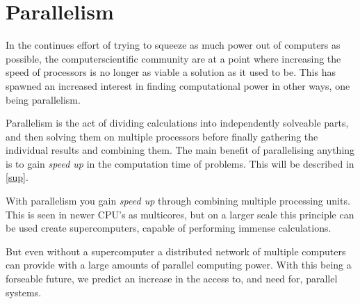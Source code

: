 

\section{Parallelism}

In the continues effort of trying to squeeze as much power out of computers as possible, the computerscientific community are at a point where increasing the speed of processors is no longer as viable a solution as it used to be. This has spawned an increased interest in finding computational power in other ways, one being parallelism.

Parallelism is the act of dividing calculations into independently solveable parts, and then solving them on multiple processors before finally gathering the individual results and combining them. The main benefit of parallelising anything is to gain \emph{speed up} in the computation time of problems. This will be described in \cref{sup}.

With parallelism you gain \emph{speed up} through combining multiple processing units. This is seen in newer CPU's as multicores, but on a larger scale this principle can be used create supercomputers, capable of performing immense calculations.

But even without a supercomputer a distributed network of multiple computers can provide with a large amounts of parallel computing power. With this being a forseable future, we predict an increase in the access to, and need for, parallel systems.

